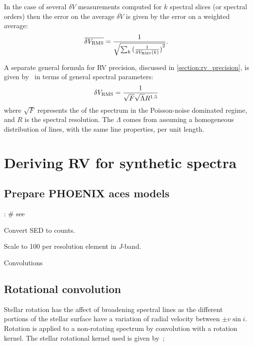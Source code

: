 In the case of several \(\delta V\) measurements computed for \(k\) spectral slices (or spectral orders) then the error on the average \(\overline{\delta V}\) is given by the error on a weighted average:
\begin{equation}
\overline{\delta {V}_{\textrm{RMS}}} = \frac{1}{\sqrt{\sum_k{{(\frac{1}{\delta V_{\textrm{RMS}}(k)})}^{2}}}}.  \label{eqn:weighted_average_error}
\end{equation}


A separate general formula for {RV} precision, discussed in \cref{section:rv_precision}, is given by~\citet{hatzes_spectrograph_1992} in terms of general spectral parameters:
\begin{equation}
\delta V_{\textrm{RMS}} = \frac{1}{\sqrt{F} \sqrt{\Lambda} {R}^{1.5}}
\end{equation}
where $\sqrt{F}$ represents the \snr{} of the spectrum in the {Poisson}-noise dominated regime, and \(R\) is the spectral resolution.
The $\Lambda$ comes from assuming a homogeneous distribution of lines, with the same line properties, per unit length.


\section{Deriving RV for synthetic spectra}

\subsection{Prepare {PHOENIX} aces models}:
\# see~\citet{figueira_radial_2016}

Convert SED to counts.


Scale to 100 \snr{} per resolution element in \emph{J}-band.

Convolutions

\subsection{Rotational convolution}
\label{subsec:rotational_convolution}
Stellar rotation has the affect of broadening spectral lines as the different portions of the stellar surface have a variation of radial velocity between \(\pm v \sin i\).
Rotation is applied to a non-rotating spectrum by convolution with a rotation kernel.
The stellar rotational kernel used is given by~\citet{gray_observation_2005};


